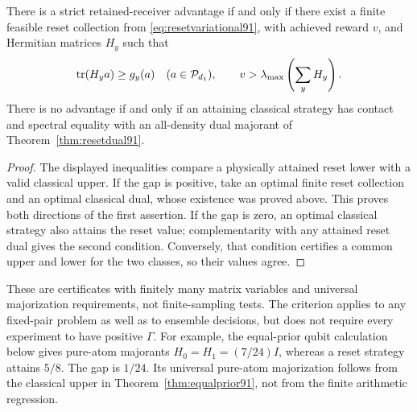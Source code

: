\begin{corollary}\label{cor:gapcertificate91}
There is a strict retained-receiver advantage if and only if there exist
a finite feasible reset collection from \eqref{eq:resetvariational91},
with achieved reward $v$, and Hermitian matrices $H_y$ such that
\[
 \operatorname{tr}(H_ya)\ge g_y(a)\quad(a\in\mathcal P_{d_1}),\qquad
 v>\lambda_{\max}\left(\sum_yH_y\right).
\]
There is no advantage if and only if an attaining classical strategy
has contact and spectral equality with an all-density dual majorant
of Theorem~\ref{thm:resetdual91}.
\end{corollary}
\begin{proof}
The displayed inequalities compare a physically attained reset lower
with a valid classical upper.  If the gap is positive, take an optimal
finite reset collection and an optimal classical dual, whose existence
was proved above.  This proves both directions of the first assertion.
If the gap is zero, an optimal classical strategy also attains the reset
value; complementarity with any attained reset dual gives the second
condition.  Conversely, that condition certifies a common upper and
lower for the two classes, so their values agree.
\end{proof}
These are certificates with finitely many matrix variables and universal
majorization requirements, not finite-sampling tests.  The criterion
applies to any fixed-pair problem as well as to ensemble decisions,
but does not require every experiment to have positive $\Gamma$.
For example, the equal-prior qubit calculation below gives pure-atom
majorants $H_0=H_1=(7/24)I$, whereas a reset strategy attains $5/8$.
The gap is $1/24$.  Its universal pure-atom majorization follows from
the classical upper in Theorem~\ref{thm:equalprior91}, not from the
finite arithmetic regression.

